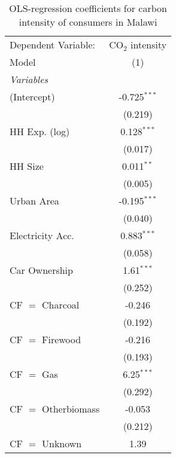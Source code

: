 
\begin{table}[htbp!]
   \centering
   \small
   \begin{adjustbox}{width = 1\textwidth, max height = 0.95\textheight, center}
      \begin{threeparttable}[b]
         \caption{\label{tab:OLS_1_MWI} OLS-regression coefficients for carbon intensity of consumers in Malawi}
         \begin{tabular}{lc}
            \tabularnewline \midrule \midrule
            Dependent Variable: & CO$_{2}$ intensity\\  
            Model               & (1)\\  
            \midrule
            \emph{Variables}\\
            (Intercept)         & -0.725$^{***}$\\   
                                & (0.219)\\   
            HH Exp. (log)       & 0.128$^{***}$\\   
                                & (0.017)\\   
            HH Size             & 0.011$^{**}$\\   
                                & (0.005)\\   
            Urban Area          & -0.195$^{***}$\\   
                                & (0.040)\\   
            Electricity Acc.    & 0.883$^{***}$\\   
                                & (0.058)\\   
            Car Ownership       & 1.61$^{***}$\\   
                                & (0.252)\\   
            CF $=$ Charcoal     & -0.246\\   
                                & (0.192)\\   
            CF $=$ Firewood     & -0.216\\   
                                & (0.193)\\   
            CF $=$ Gas          & 6.25$^{***}$\\   
                                & (0.292)\\   
            CF $=$ Otherbiomass & -0.053\\   
                                & (0.212)\\   
            CF $=$ Unknown      & 1.39\\   

\end{tabular}
\end{threeparttable}
\end{adjustbox}
\end{table}
